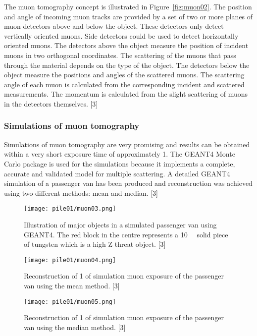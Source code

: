 \documentclass[twocolumn,a4paper]{article}
\begin{document}
The muon tomography concept is illustrated in
Figure~\ref{fig:muon02}. The position and angle of incoming muon
tracks are provided by a set of two or more planes of muon detectors
above and below the object. These detectors only detect vertically
oriented muons. Side detectors could be used to detect horizontally
oriented muons. The detectors above the object measure the position of
incident muons in two orthogonal coordinates. The scattering of the
muons that pass through the material depends on the type of the
object. The detectors below the object measure the positions and
angles of the scattered muons. The scattering angle of each muon is
calculated from the corresponding incident and scattered
measurements. The momentum is calculated from the slight scattering of
muons in the detectors themselves. [3]

\subsubsection{Simulations of muon tomography}
Simulations of muon tomography are very promising and results can be
obtained within a very short exposure time of approximately
\unit{1}{\minute}. The GEANT4 Monte Carlo package is used for the
simulations because it implements a complete, accurate and validated
model for multiple scattering. A detailed GEANT4 simulation of a
passenger van has been produced and reconstruction was achieved using
two different methods: mean and median. [3]

\begin{figure}
  \texttt{[image: pile01/muon03.png]}
  \caption{Illustration of major objects in a simulated passenger van
    using GEANT4. The red block in the centre represents a
    \unit{10}{\cubic{\centi\metre}} solid piece of
    tungsten which is a high Z threat object. [3]}
\end{figure}
\begin{figure}
  \texttt{[image: pile01/muon04.png]}
  \caption{Reconstruction of \unit{1}{\minute} of simulation muon
    exposure of the passenger van using the mean method. [3]}
  \label{fig:muon04}
\end{figure}
\begin{figure}
  \texttt{[image: pile01/muon05.png]}
  \caption{Reconstruction of \unit{1}{\minute} of simulation muon
    exposure of the passenger van using the median method. [3]}
  \label{fig:muon05}
\end{figure}
\end{document}
